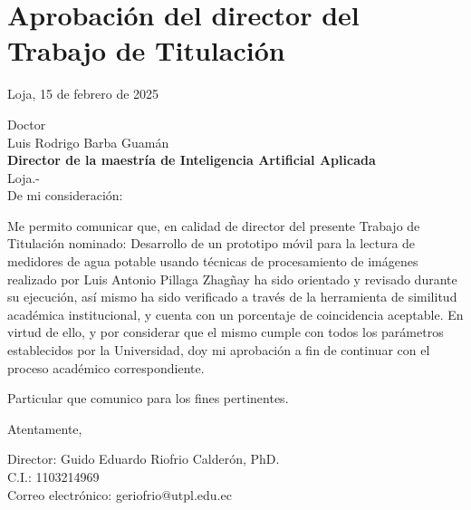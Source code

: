 \chapter*{Aprobación del director del Trabajo de Titulación}

\vspace{1cm}

Loja, 15 de febrero de 2025

\vspace{1cm}

Doctor\\
Luis Rodrigo Barba Guamán\\
\textbf{Director de la maestría de Inteligencia Artificial Aplicada}\\

Loja.-\\

De mi consideración:

\vspace{0.5cm}

Me permito comunicar que, en calidad de director del presente Trabajo 
de Titulación nominado: Desarrollo de un prototipo móvil para la lectura
de medidores de agua potable usando técnicas de procesamiento de imágenes
realizado por Luis Antonio Pillaga Zhagñay ha sido orientado y revisado
durante su ejecución, así mismo ha sido verificado a través de la
herramienta de similitud académica institucional, y cuenta con un
porcentaje de coincidencia aceptable. En virtud de ello, y por considerar
que el mismo cumple con todos los parámetros establecidos por la
Universidad, doy mi aprobación a fin de continuar con el proceso
académico correspondiente.

\vspace{0.5cm}

Particular que comunico para los fines pertinentes.

\vspace{1cm}

Atentamente,

\vspace{3cm}

\noindent
Director: Guido Eduardo Riofrio Calderón, PhD.\\
C.I.: 1103214969\\
Correo electrónico: geriofrio@utpl.edu.ec